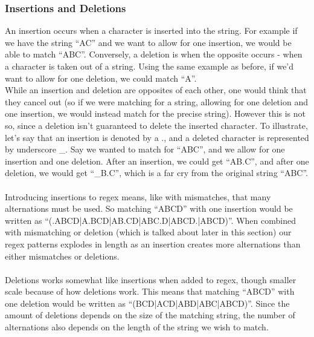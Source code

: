\subsubsection*{Insertions and Deletions}
An insertion occurs when a character is inserted into the string. 
For example if we have the string ``AC'' and we want to allow for one 
insertion, we would be able to match ``ABC''. Conversely, 
a deletion is when the opposite occurs - when a character is taken out of a string. 
Using the same example as before, if we'd want to allow for one deletion, we 
could match ``A''.\\
While an insertion and deletion are opposites of each other, one would think that 
they cancel out (so if we were matching for a string, allowing for one deletion 
and one insertion, we would instead match for the precise string). However 
this is not so, since a deletion isn't guaranteed to delete the inserted character. 
To illustrate, let's say that an insertion is denoted by a ., 
and a deleted character is represented by underscore \_. Say we wanted to match 
for ``ABC'', and we allow for one insertion and one deletion. After an insertion, 
we could get ``AB.C'', and after one deletion, we would get ``\_B.C'', which is a 
far cry from the original string ``ABC''.\\\\
Introducing insertions to regex means, like with mismatches, that many 
alternations must be used. So matching ``ABCD'' with one insertion would be 
written as ``(.ABCD|A.BCD|AB.CD|ABC.D|ABCD.|ABCD)''. When combined with mismatching 
or deletion (which is talked about later in this section) our regex patterns 
explodes in length as an insertion creates more alternations than either 
mismatches or deletions.\\\\
Deletions works somewhat like insertions when added to regex, though smaller 
scale because of how deletions work. This means that matching ``ABCD'' with 
one deletion would be written as ``(BCD|ACD|ABD|ABC|ABCD)''. Since the 
amount of deletions depends on the size of the matching string, the number 
of alternations also depends on the length of the string we wish to 
match.

